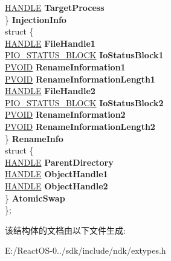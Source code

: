 \begin{DoxyCompactItemize}
\begin{tabbing}
\>\>\hyperlink{interfacevoid}{HANDLE} {\bfseries TargetProcess}\\
\>\} {\bfseries InjectionInfo}\\
\>struct \{\\
\>\>\hyperlink{interfacevoid}{HANDLE} {\bfseries FileHandle1}\\
\>\>\hyperlink{struct___i_o___s_t_a_t_u_s___b_l_o_c_k}{PIO\_STATUS\_BLOCK} {\bfseries IoStatusBlock1}\\
\>\>\hyperlink{interfacevoid}{PVOID} {\bfseries RenameInformation1}\\
\>\>\hyperlink{interfacevoid}{PVOID} {\bfseries RenameInformationLength1}\\
\>\>\hyperlink{interfacevoid}{HANDLE} {\bfseries FileHandle2}\\
\>\>\hyperlink{struct___i_o___s_t_a_t_u_s___b_l_o_c_k}{PIO\_STATUS\_BLOCK} {\bfseries IoStatusBlock2}\\
\>\>\hyperlink{interfacevoid}{PVOID} {\bfseries RenameInformation2}\\
\>\>\hyperlink{interfacevoid}{PVOID} {\bfseries RenameInformationLength2}\\
\>\} {\bfseries RenameInfo}\\
\>struct \{\\
\>\>\hyperlink{interfacevoid}{HANDLE} {\bfseries ParentDirectory}\\
\>\>\hyperlink{interfacevoid}{HANDLE} {\bfseries ObjectHandle1}\\
\>\>\hyperlink{interfacevoid}{HANDLE} {\bfseries ObjectHandle2}\\
\>\} {\bfseries AtomicSwap}\\
\}; \\

\end{tabbing}\end{DoxyCompactItemize}


该结构体的文档由以下文件生成\+:\begin{DoxyCompactItemize}
\item 
E\+:/\+React\+O\+S-\/0../sdk/include/ndk/extypes.\+h\end{DoxyCompactItemize}
